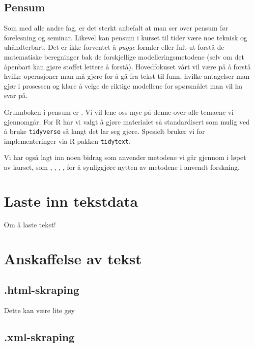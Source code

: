 \documentclass[
]{book}
\begin{document}
\hypertarget{pensum}{%
\section{Pensum}\label{pensum}}

Som med alle andre fag, er det sterkt anbefalt at man ser over pensum før forelesning og seminar. Likevel kan pensum i kurset til tider være noe teknisk og uhåndterbart. Det er ikke forventet å \emph{pugge} formler eller fult ut forstå de matematiske beregninger bak de forskjellige modelleringsmetodene (selv om det åpenbart kan gjøre stoffet lettere å forstå). Hovedfokuset vårt vil være på å forstå hvilke operasjoner man må gjøre for å gå fra tekst til funn, hvilke antagelser man gjør i prosessen og klare å velge de riktige modellene for spørsmålet man vil ha svar på.

Grunnboken i pensum er \citet{Grimmer2022}. Vi vil lene oss mye på denne over alle temaene vi gjennomgår. For R har vi valgt å gjøre materialet så standardisert som mulig ved å bruke \texttt{tidyverse} så langt det lar seg gjøre. Spesielt bruker vi \citet{Silge2017} for implementeringer via R-pakken \texttt{tidytext}.

Vi har også lagt inn noen bidrag som anvender metodene vi går gjennom i løpet av kurset, som \citet{Peterson2018}, \citet{Lauderdale2016}, \citet{Hoyland2019}, \citet{Finseraas2021}, for å synliggjøre nytten av metodene i anvendt forskning.

\hypertarget{lastetekst}{%
\chapter{Laste inn tekstdata}\label{lastetekst}}

Om å laste tekst!

\hypertarget{anskaff}{%
\chapter{Anskaffelse av tekst}\label{anskaff}}

\hypertarget{html-skraping}{%
\section{.html-skraping}\label{html-skraping}}

Dette kan være lite gøy

\hypertarget{xml-skraping}{%
\section{.xml-skraping}\label{xml-skraping}}
\end{document}
